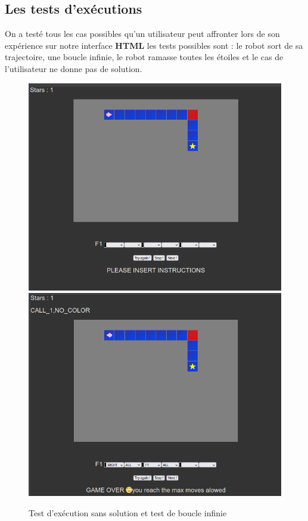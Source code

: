 \documentclass[11pt]{article}
\begin{document}
\subsection{Les tests d'exécutions}
On a testé tous les cas possibles qu'un utilisateur peut affronter lors de son expérience sur notre interface \textbf{HTML} les tests possibles sont : le robot sort de sa trajectoire, une boucle infinie, le robot ramasse toutes les étoiles et le cas de l'utilisateur ne donne pas de solution.
\begin{figure}[h!]
\begin{center}
\includegraphics[scale=0.3]{html2.png} \quad
\includegraphics[scale=0.3]{html3.png}
\caption{Test d'exécution sans solution et test de boucle infinie}
\end{center}
\end{figure}
\end{document}
